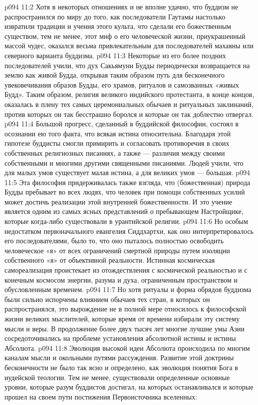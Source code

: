 \vs p094 11:2 \pc Хотя в некоторых отношениях и не вполне удачно, что буддизм не распространился по миру до того, как последователи Гаутамы настолько извратили традиции и учения этого культа, что сделали его божественным существом, тем не менее, этот миф о его человеческой жизни, приукрашенный массой чудес, оказался весьма привлекательным для последователей махаяны или северного варианта буддизма.
\vs p094 11:3 Некоторые из его более поздних последователей учили, что дух Сакьямуни Будды периодически возвращается на землю как живой Будда, открывая таким образом путь для бесконечного увековечивания образов Будды, его храмов, ритуалов и самозванных «живых Будд». Таким образом, религия великого индийского протестанта, в конце концов, оказалась в плену тех самых церемониальных обычаев и ритуальных заклинаний, против которых он так бесстрашно боролся и которые он так доблестно отвергал.
\vs p094 11:4 \pc Большой прогресс, сделанный в буддийской философии, состоял в осознании ею того факта, что всякая истина относительна. Благодаря этой гипотезе буддисты смогли примирить и согласовать противоречия в своих собственных религиозных писаниях, а также --- различия между своими собственными и многими другими священными писаниями. Людей учили, что для малых умов существует малая истина, а для великих умов --- большая.
\vs p094 11:5 Эта философия придерживалась также взгляда, что (божественная) природа Будды пребывает во всех людях, что человек при помощи собственных усилий может достичь реализации этой внутренней божественности. И это учение является одним из самых ясных представлений о пребывающем Настройщике, которые когда\hyp{}либо существовали в урантийской религии.
\vs p094 11:6 Но особым недостатком первоначального евангелия Сиддхартхи, как оно интерпретировалось его последователями, было то, что оно пыталось полностью освободить человеческое «я» от всех ограничений смертной природы путем изоляции собственного «я» от объективной реальности. Истинная космическая самореализация проистекает из отождествления с космической реальностью и с конечным космосом энергии, разума и духа, ограниченным пространством и обусловленным временем.
\vs p094 11:7 Но хотя ритуалы и форма обрядов буддизма были сильно испорчены влиянием обычаев тех стран, в которых он распространялся, это вырождение не в полной мере относилось к философской жизни великих мыслителей, которые время от времени избирали эту систему мысли и веры. В продолжение более двух тысяч лет многие лучшие умы Азии сосредоточивались на проблеме установления абсолютной истины и истины Абсолюта.
\vs p094 11:8 Эволюция высокой идеи Абсолюта происходила по многим каналам мысли и окольными путями рассуждения. Развитие этой доктрины бесконечности не было так ясно и определено, как эволюция понятия Бога в иудейской теологии. Тем не менее, существовали определенные основные уровни, которые разум буддистов достигал, на которых останавливался и которые прошел на своем пути постижения Первоисточника вселенных:
